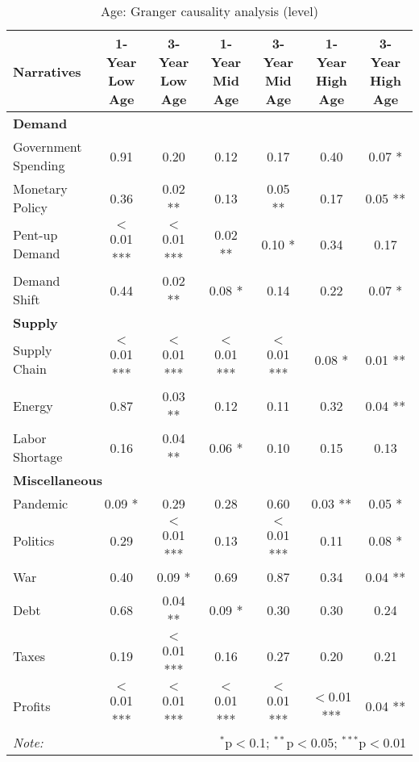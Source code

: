 \begin{sidewaystable}[ht]
\centering
\caption{Age: Granger causality analysis (level)}\label{table:granger}

\begin{tabular}{lcccccc}
\toprule
\textbf{Narratives} & \textbf{1-Year Low Age} & \textbf{3-Year Low Age} & \textbf{1-Year Mid Age} & \textbf{3-Year Mid Age} & \textbf{1-Year High Age} & \textbf{3-Year High Age} \\
\midrule
\multicolumn{7}{l}{\textbf{Demand}} \\
\midrule
Government Spending & 0.91 & 0.20 & 0.12 & 0.17 & 0.40 & 0.07 * \\
Monetary Policy & 0.36 & 0.02 ** & 0.13 & 0.05 ** & 0.17 & 0.05 ** \\
Pent-up Demand & $<$0.01 *** & $<$0.01 *** & 0.02 ** & 0.10 * & 0.34 & 0.17 \\
Demand Shift & 0.44 & 0.02 ** & 0.08 * & 0.14 & 0.22 & 0.07 * \\
\midrule
\multicolumn{7}{l}{\textbf{Supply}} \\
\midrule
Supply Chain & $<$0.01 *** & $<$0.01 *** & $<$0.01 *** & $<$0.01 *** & 0.08 * & 0.01 ** \\
Energy & 0.87 & 0.03 ** & 0.12 & 0.11 & 0.32 & 0.04 ** \\
Labor Shortage & 0.16 & 0.04 ** & 0.06 * & 0.10 & 0.15 & 0.13 \\
\midrule
\multicolumn{7}{l}{\textbf{Miscellaneous}} \\
\midrule
Pandemic & 0.09 * & 0.29 & 0.28 & 0.60 & 0.03 ** & 0.05 * \\
Politics & 0.29 & $<$0.01 *** & 0.13 & $<$0.01 *** & 0.11 & 0.08 * \\
War & 0.40 & 0.09 * & 0.69 & 0.87 & 0.34 & 0.04 ** \\
Debt & 0.68 & 0.04 ** & 0.09 * & 0.30 & 0.30 & 0.24 \\
Taxes & 0.19 & $<$0.01 *** & 0.16 & 0.27 & 0.20 & 0.21 \\
Profits & $<$0.01 *** & $<$0.01 *** & $<$0.01 *** & $<$0.01 *** & $<$0.01 *** & 0.04 ** \\
\midrule
\bottomrule
\textit{Note:}  & \multicolumn{6}{r}{$^{*}$p$<$0.1; $^{**}$p$<$0.05; $^{***}$p$<$0.01} \\
\bottomrule
\end{tabular}
\end{sidewaystable}
